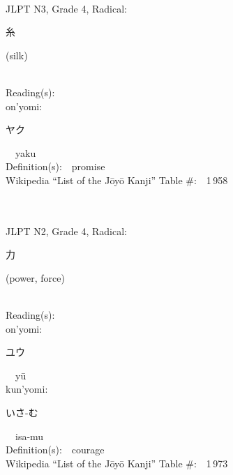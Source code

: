 \begin{multicols}{2}
{\fontsize{34pt}{40pt}  }\ \ \\  %
{JLPT N3, Grade 4, Radical:\ \ {\begin{CJK}{UTF8}{min} 糸 \end{CJK}} (silk) } \\
Reading(s):\ \ \\
{\hspace*{1em}}on'yomi:\ \ \\
{\hspace*{2em}}{\begin{CJK}{UTF8}{min} ヤク \end{CJK}}\ \ yaku\ \ \\
Definition(s):\ \ promise \\
Wikipedia ``List of the J\=oy\=o Kanji'' Table \#:\ \ 1\,958 \\
\ \ \\
{\fontsize{34pt}{40pt}  }\ \ \\  %
{JLPT N2, Grade 4, Radical:\ \ {\begin{CJK}{UTF8}{min} 力 \end{CJK}} (power, force) } \\
Reading(s):\ \ \\
{\hspace*{1em}}on'yomi:\ \ \\
{\hspace*{2em}}{\begin{CJK}{UTF8}{min} ユウ \end{CJK}}\ \ y\=u\ \ \\
{\hspace*{1em}}kun'yomi:\ \ \\
{\hspace*{2em}}{\begin{CJK}{UTF8}{min} いさ-む \end{CJK}}\ \ isa-mu\ \ \\
Definition(s):\ \ courage \\
Wikipedia ``List of the J\=oy\=o Kanji'' Table \#:\ \ 1\,973 \\
\ \ \\
{\fontsize{34pt}{40pt}  }\ \ \\  %

\end{multicols}
